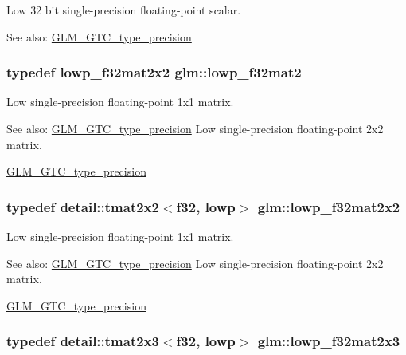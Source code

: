 Low 32 bit single-precision floating-point scalar. \begin{Desc}
\item[See also:]\hyperlink{group__gtc__type__precision}{GLM\_\-GTC\_\-type\_\-precision} \end{Desc}
\hypertarget{group__gtc__type__precision_gd717448ef1129d7b795ebcfee6c4944c}{
\subsubsection[lowp\_\-f32mat2]{\setlength{\rightskip}{0pt plus 5cm}typedef lowp\_\-f32mat2x2 {\bf glm::lowp\_\-f32mat2}}}
\label{group__gtc__type__precision_gd717448ef1129d7b795ebcfee6c4944c}


Low single-precision floating-point 1x1 matrix. \begin{Desc}
\item[See also:]\hyperlink{group__gtc__type__precision}{GLM\_\-GTC\_\-type\_\-precision} Low single-precision floating-point 2x2 matrix. 

\hyperlink{group__gtc__type__precision}{GLM\_\-GTC\_\-type\_\-precision} \end{Desc}
\hypertarget{group__gtc__type__precision_ge5beaa9212ba199167c7c7088a70b2bd}{
\subsubsection[lowp\_\-f32mat2x2]{\setlength{\rightskip}{0pt plus 5cm}typedef detail::tmat2x2$<$f32, lowp$>$ {\bf glm::lowp\_\-f32mat2x2}}}
\label{group__gtc__type__precision_ge5beaa9212ba199167c7c7088a70b2bd}


Low single-precision floating-point 1x1 matrix. \begin{Desc}
\item[See also:]\hyperlink{group__gtc__type__precision}{GLM\_\-GTC\_\-type\_\-precision} Low single-precision floating-point 2x2 matrix. 

\hyperlink{group__gtc__type__precision}{GLM\_\-GTC\_\-type\_\-precision} \end{Desc}
\hypertarget{group__gtc__type__precision_g7e45acb54ae2e4f5113a05b08eea5812}{
\subsubsection[lowp\_\-f32mat2x3]{\setlength{\rightskip}{0pt plus 5cm}typedef detail::tmat2x3$<$f32, lowp$>$ {\bf glm::lowp\_\-f32mat2x3}}}
\label{group__gtc__type__precision_g7e45acb54ae2e4f5113a05b08eea5812}


